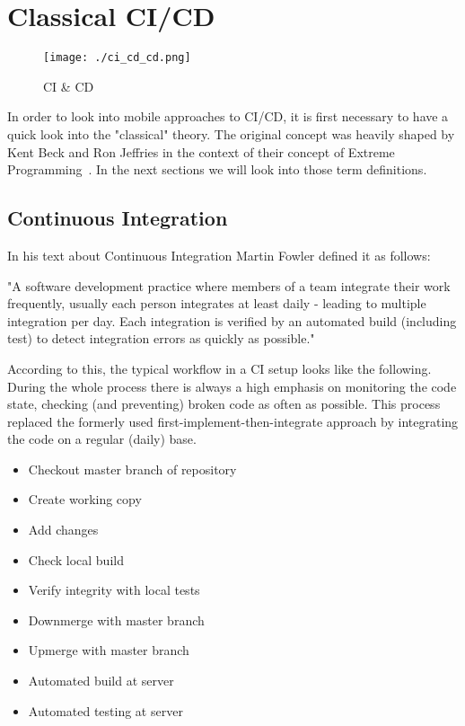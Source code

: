 \section{Classical CI/CD}

\begin{figure}[htb]
	\centering
	\texttt{[image: ./ci\_cd\_cd.png]}
	\caption[CI \& CD]{CI \& CD\footnotemark}
	\label{fig_ci_cd}
\end{figure}

In order to look into mobile approaches to CI/CD, it is first necessary to have a quick look into the "classical" theory. The original concept was heavily shaped by Kent Beck and Ron Jeffries in the context of their concept of Extreme Programming~\cite{beck1998extreme, beck2000extreme}. In the next sections we will look into those term definitions.

\subsection{Continuous Integration}
In his text about Continuous Integration Martin Fowler defined it as follows:

\begin{quoting}
"A software development practice where members of a team integrate their work frequently, usually each person integrates at least daily - leading to multiple integration per day. Each integration is verified by an automated build (including test) to detect integration errors as quickly as possible."~\cite{fowler2006continuous}
\end{quoting}

According to this, the typical workflow in a CI setup looks like the following. During the whole process there is always a high emphasis on monitoring the code state, checking (and preventing) broken code as often as possible. This process replaced the formerly used first-implement-then-integrate approach by integrating the code on a regular (daily) base.

\begin{itemize}
	\item Checkout master branch of repository
	\item Create working copy
	\item Add changes
	\item Check local build
	\item Verify integrity with local tests
	\item Downmerge with master branch
	\item Upmerge with master branch
	\item Automated build at server
	\item Automated testing at server
\end{itemize} 

